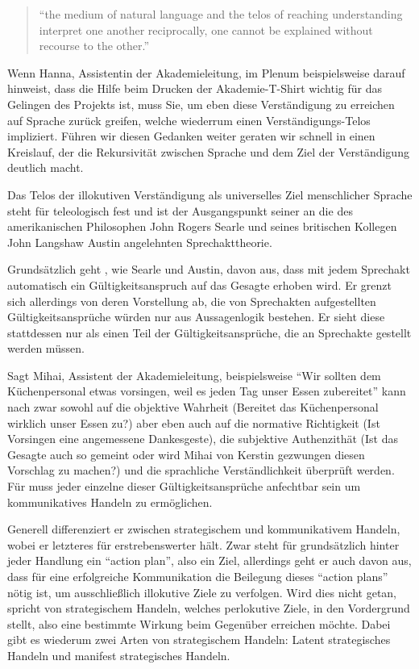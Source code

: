 	\begin{quote}
		``the medium of natural language and the telos of reaching understanding interpret one another reciprocally, one cannot be explained without recourse to the other.''
			\parencite[218]{Habermas-1998-aa}
	\end{quote}

Wenn Hanna, Assistentin der Akademieleitung, im Plenum beispielsweise darauf hinweist, dass die Hilfe beim Drucken der Akademie-T-Shirt wichtig für das Gelingen des Projekts ist, muss Sie, um eben diese Verständigung zu erreichen auf Sprache zurück greifen, welche wiederrum einen Verständigungs-Telos impliziert.
Führen wir diesen Gedanken weiter geraten wir schnell in einen Kreislauf, der die Rekursivität zwischen Sprache und dem Ziel der Verständigung deutlich macht.

Das Telos der illokutiven Verständigung als universelles Ziel menschlicher Sprache steht für \citeauthor{Habermas-1998-aa} teleologisch fest und ist der Ausgangspunkt seiner an die des amerikanischen Philosophen John Rogers Searle und seines britischen Kollegen John Langshaw Austin angelehnten Sprechakttheorie.

Grundsätzlich geht \citeauthor{Habermas-1998-aa}, wie Searle und Austin, davon aus, dass mit jedem Sprechakt automatisch ein Gültigkeitsanspruch auf das Gesagte erhoben wird.
Er grenzt sich allerdings von deren Vorstellung ab, die von Sprechakten aufgestellten Gültigkeitsansprüche würden nur aus Aussagenlogik bestehen.
Er sieht diese stattdessen nur als einen Teil der Gültigkeitsansprüche, die an Sprechakte gestellt werden müssen.

Sagt Mihai, Assistent der Akademieleitung, beispielsweise ``Wir sollten dem Küchenpersonal etwas vorsingen, weil es jeden Tag unser Essen zubereitet'' kann nach \citeauthor{Habermas-1998-aa} zwar sowohl auf die objektive Wahrheit (Bereitet das Küchenpersonal wirklich unser Essen zu?) aber eben auch auf die normative Richtigkeit (Ist Vorsingen eine angemessene Dankesgeste), die subjektive Authenzithät (Ist das Gesagte auch so gemeint oder wird Mihai von Kerstin gezwungen diesen Vorschlag zu machen?) und die sprachliche Verständlichkeit überprüft werden.
Für \citeauthor{Habermas-1998-aa} muss jeder einzelne dieser Gültigkeitsansprüche anfechtbar sein um kommunikatives Handeln zu ermöglichen.

Generell differenziert er zwischen strategischem und kommunikativem Handeln, wobei er letzteres für erstrebenswerter hält.
Zwar steht für \citeauthor{Habermas-1998-aa} grundsätzlich hinter jeder Handlung ein ``action plan'', also ein Ziel, allerdings geht er auch davon aus, dass für eine erfolgreiche Kommunikation die Beilegung dieses ``action plans'' nötig ist, um ausschließlich illokutive Ziele zu verfolgen.
Wird dies nicht getan, spricht \citeauthor{Habermas-1998-aa} von strategischem Handeln, welches perlokutive Ziele, in den Vordergrund stellt, also eine bestimmte Wirkung beim Gegenüber erreichen möchte.
Dabei gibt es wiederum zwei Arten von strategischem Handeln:
Latent strategisches Handeln und manifest strategisches Handeln.

